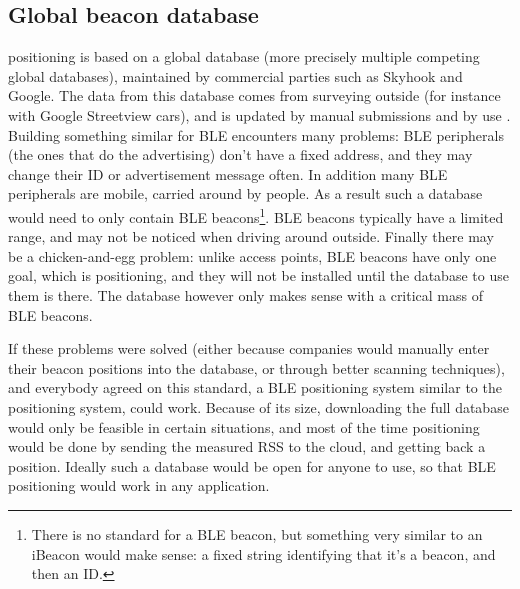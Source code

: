 \subsection{Global beacon database}
\Wifi positioning is based on a global database (more precisely multiple competing global databases), maintained by commercial parties such as Skyhook and Google.
The data from this database comes from surveying outside (for instance with Google Streetview cars), and is updated by manual submissions and by use .
Building something similar for BLE encounters many problems: BLE peripherals (the ones that do the advertising) don't have a fixed address, and they may change their ID or advertisement message often.
In addition many BLE peripherals are mobile, carried around by people.
As a result such a database would need to only contain BLE beacons\footnote{There is no standard for a BLE beacon, but something very similar to an iBeacon would make sense: a fixed string identifying that it's a beacon, and then an ID.}. 
BLE beacons typically have a limited range, and may not be noticed when driving around outside.
Finally there may be a chicken-and-egg problem: unlike \wifi access points, BLE beacons have only one goal, which is positioning, and they will not be installed until the database to use them is there.
The database however only makes sense with a critical mass of BLE beacons.

If these problems were solved (either because companies would manually enter their beacon positions into the database, or through better scanning techniques), and everybody agreed on this standard, a BLE positioning system similar to the \wifi positioning system, could work.
Because of its size, downloading the full database would only be feasible in certain situations, and most of the time positioning would be done by sending the measured RSS to the cloud, and getting back a position.
Ideally such a database would be open for anyone to use, so that BLE positioning would work in any application.

